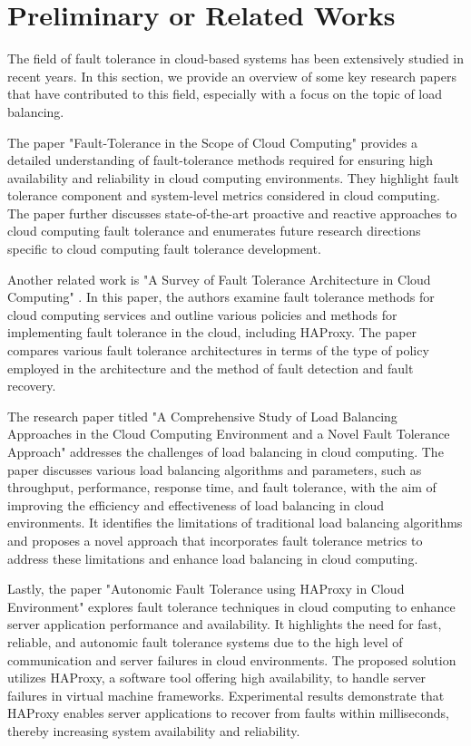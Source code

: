 \documentclass[lettersize,journal]{IEEEtran}
\begin{document}
\section{Preliminary or Related Works}
\noindent 
The field of fault tolerance in cloud-based systems has been extensively studied in recent years. In this section, we provide an overview of some key research papers that have contributed to this field, especially with a focus on the topic of load balancing.

The paper "Fault-Tolerance in the Scope of Cloud Computing" \cite{paper_faultTolerance} provides a detailed understanding of fault-tolerance methods required for ensuring high availability and reliability in cloud computing environments. They highlight fault tolerance component and system-level metrics considered in cloud computing. The paper further discusses state-of-the-art proactive and reactive approaches to cloud computing fault tolerance and enumerates future research directions specific to cloud computing fault tolerance development.

Another related work is "A Survey of Fault Tolerance Architecture in Cloud Computing" \cite{paper_surveyArchitectures}. In this paper, the authors examine fault tolerance methods for cloud computing services and outline various policies and methods for implementing fault tolerance in the cloud, including HAProxy. The paper compares various fault tolerance architectures in terms of the type of policy employed in the architecture and the method of fault detection and fault recovery.

The research paper titled "A Comprehensive Study of Load Balancing Approaches in the Cloud Computing Environment and a Novel Fault Tolerance Approach" \cite{study_load_balancing} addresses the challenges of load balancing in cloud computing. The paper discusses various load balancing algorithms and parameters, such as throughput, performance, response time, and fault tolerance, with the aim of improving the efficiency and effectiveness of load balancing in cloud environments. It identifies the limitations of traditional load balancing algorithms and proposes a novel approach that incorporates fault tolerance metrics to address these limitations and enhance load balancing in cloud computing.

Lastly, the paper "Autonomic Fault Tolerance using HAProxy in Cloud Environment" \cite{autonomic_fault_tolerance} explores fault tolerance techniques in cloud computing to enhance server application performance and availability. It highlights the need for fast, reliable, and autonomic fault tolerance systems due to the high level of communication and server failures in cloud environments. The proposed solution utilizes HAProxy, a software tool offering high availability, to handle server failures in virtual machine frameworks. Experimental results demonstrate that HAProxy enables server applications to recover from faults within milliseconds, thereby increasing system availability and reliability.
\end{document}
